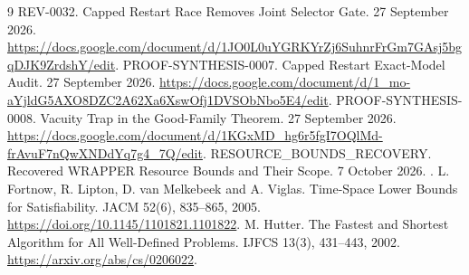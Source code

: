 \documentclass[11pt]{article}
\begin{document}
\begin{thebibliography}{9}
 REV-0032. Capped Restart Race Removes Joint Selector Gate.
27 September 2026. \url{https://docs.google.com/document/d/1JO0L0uYGRKYrZj6SuhnrFrGm7GAsj5bgqDJK9ZrdshY/edit}.
 PROOF-SYNTHESIS-0007. Capped Restart Exact-Model Audit.
27 September 2026. \url{https://docs.google.com/document/d/1_mo-aYjldG5AXO8DZC2A62Xa6XswOfj1DVSObNbo5E4/edit}.
 PROOF-SYNTHESIS-0008. Vacuity Trap in the Good-Family Theorem.
27 September 2026. \url{https://docs.google.com/document/d/1KGxMD_hg6r5fgI7OQlMd-frAvuF7nQwXNDdYq7g4_7Q/edit}.
 RESOURCE\_BOUNDS\_RECOVERY. Recovered WRAPPER Resource
Bounds and Their Scope. 7 October 2026.
.
 L. Fortnow, R. Lipton, D. van Melkebeek and A. Viglas.
Time-Space Lower Bounds for Satisfiability. JACM 52(6), 835--865, 2005.
\url{https://doi.org/10.1145/1101821.1101822}.
 M. Hutter. The Fastest and Shortest Algorithm for All
Well-Defined Problems. IJFCS 13(3), 431--443, 2002.
\url{https://arxiv.org/abs/cs/0206022}.
\end{thebibliography}
\end{document}
